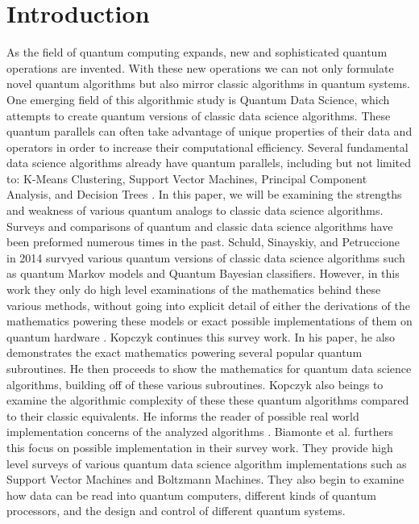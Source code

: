 \documentclass[conference]{IEEEtran}
\begin{document}
\section{Introduction}
As the field of quantum computing expands, new and sophisticated quantum operations are invented. With these new operations we can not only formulate novel quantum algorithms but also mirror classic algorithms in quantum systems. One emerging field of this algorithmic study is Quantum Data Science, which attempts to create quantum versions of classic data science algorithms. These quantum parallels can often take advantage of unique properties of their data and operators in order to increase their computational efficiency. Several fundamental data science algorithms already have quantum parallels, including but not limited to: K-Means Clustering, Support Vector Machines, Principal Component Analysis, and Decision Trees \cite{b1} \cite{b2} \cite{b3} \cite{b4}. 
\newline
\indent In this paper, we will be examining the strengths and weakness of various quantum analogs to classic data science algorithms. Surveys and comparisons of quantum and classic data science algorithms have been preformed numerous times in the past. Schuld, Sinayskiy, and Petruccione in 2014 survyed various quantum versions of classic data science algorithms such as quantum Markov models and Quantum Bayesian classifiers. However, in this work they only do high level examinations of the mathematics behind these various methods, without going into explicit detail of either the derivations of the mathematics powering these models or exact possible implementations of them on quantum hardware \cite{b5}.
\newline
\indent Kopczyk continues this survey work. In his paper, he also demonstrates the exact mathematics powering several popular quantum subroutines. He then proceeds to show the mathematics for quantum data science algorithms, building off of these various subroutines. Kopczyk also beings to examine the algorithmic complexity of these these quantum algorithms compared to their classic equivalents. He informs the reader of possible real world implementation concerns of the analyzed algorithms \cite{b6}. 
\newline
\indent Biamonte et al. furthers this focus on possible implementation in their survey work. They provide high level surveys of various quantum data science algorithm implementations such as Support Vector Machines and Boltzmann Machines. They also begin to examine how data can be read into quantum computers, different kinds of quantum processors, and the design and control of different quantum systems.\cite{b7}
\end{document}
